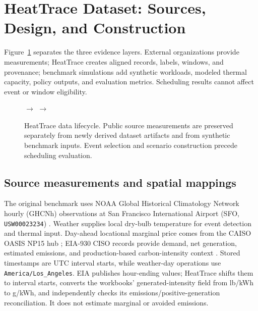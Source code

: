 \documentclass[pdflatex,sn-mathphys-num]{sn-jnl}
\begin{document}
\section{HeatTrace Dataset: Sources, Design, and Construction}\label{sec:data}

Figure~\ref{fig:pipeline} separates the three evidence layers. External organizations provide measurements; HeatTrace creates aligned records, labels, windows, and provenance; benchmark simulations add synthetic workloads, modeled thermal capacity, policy outputs, and evaluation metrics. Scheduling results cannot affect event or window eligibility.

\begin{figure}[t]
\centering
\setlength{\fboxsep}{7pt}
\hspace{0.01\textwidth}$\boldsymbol{\longrightarrow}$\hspace{0.01\textwidth}
\hspace{0.01\textwidth}$\boldsymbol{\longrightarrow}$\hspace{0.01\textwidth}
\caption{HeatTrace data lifecycle. Public source measurements are preserved separately from newly derived dataset artifacts and from synthetic benchmark inputs. Event selection and scenario construction precede scheduling evaluation.}
\label{fig:pipeline}
\end{figure}

\subsection{Source measurements and spatial mappings}

The original benchmark uses NOAA Global Historical Climatology Network hourly (GHCNh) observations at San Francisco International Airport (SFO, \texttt{USW00023234}) \cite{noaaGhcnh}. Weather supplies local dry-bulb temperature for event detection and thermal input. Day-ahead locational marginal price comes from the CAISO OASIS NP15 hub \cite{caisoPrices}; EIA-930 CISO records provide demand, net generation, estimated emissions, and production-based carbon-intensity context \cite{eia930}. Stored timestamps are UTC interval starts, while weather-day operations use \texttt{America/Los\_Angeles}. EIA publishes hour-ending values; HeatTrace shifts them to interval starts, converts the workbooks' generated-intensity field from lb/kWh to g/kWh, and independently checks its emissions/positive-generation reconciliation. It does not estimate marginal or avoided emissions.
\end{document}
